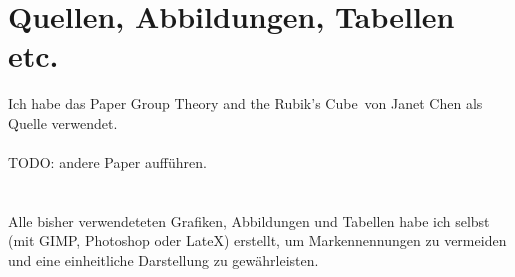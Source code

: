 \documentclass[12pt,a4paper, usenames, dvipsnames]{article}
\begin{document}
\section{Quellen, Abbildungen, Tabellen etc.}
Ich habe das Paper \glqq Group Theory and the Rubik's Cube\grqq \  von Janet Chen als Quelle verwendet.\\ 
\\
TODO: andere Paper aufführen.
\\ \\ \\
Alle bisher verwendeteten Grafiken, Abbildungen und Tabellen habe ich selbst (mit GIMP, Photoshop oder LateX) erstellt, um Markennennungen zu vermeiden und eine einheitliche Darstellung zu gewährleisten.

\newpage


\printbibliography
\end{document}
